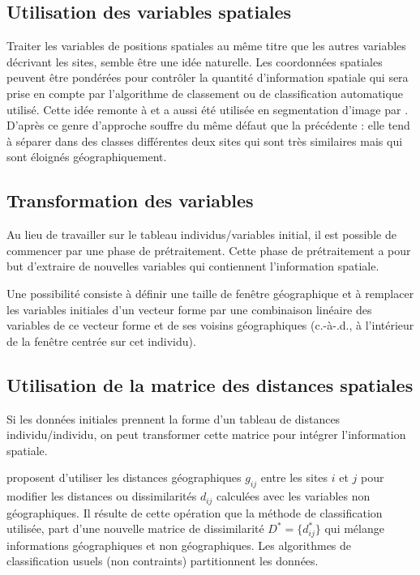 \subsection{Utilisation des variables spatiales}
Traiter les variables de positions spatiales au m\^eme titre que les 
autres variables d\'ecrivant les sites, semble \^etre une
id\'ee naturelle. Les coordonn\'ees
spatiales peuvent \^etre pond\'er\'ees pour contr\^oler
la quantit\'e d'information spatiale qui sera prise en compte par l'algorithme
de classement ou de classification automatique utilis\'e. Cette id\'ee remonte
\`a  et a aussi \'et\'e utilis\'ee en segmentation
d'image par . D'apr\`es  ce genre 
d'approche souffre du m\^eme d\'efaut que la pr\'ec\'edente : elle tend
\`a s\'eparer dans des classes diff\'erentes deux sites qui sont
tr\`es similaires mais qui sont \'eloign\'es g\'eographiquement.  



\subsection{Transformation des variables}

Au lieu de travailler sur le tableau individus/variables initial, il est
possible de commencer par une phase de pr\'etraitement. Cette phase de
pr\'etraitement a pour but d'extraire de nouvelles variables qui 
contiennent l'information spatiale.
\begin{ex}
Une possibilit\'e consiste \`a d\'efinir une taille de fen\^etre g\'eographique
et \`a remplacer les variables initiales d'un vecteur forme par une combinaison lin\'eaire
des variables de ce vecteur forme et de ses voisins g\'eographiques 
(c.-\`a-.d., \`a l'int\'erieur de la fen\^etre centr\'ee sur cet individu).
\end{ex}


\subsection{Utilisation de la matrice des distances spatiales}

Si les donn\'ees initiales prennent la forme d'un 
tableau de distances individu/individu, on peut 
transformer cette matrice pour int\'egrer l'information
spatiale.

 proposent d'utiliser les distances
g\'eographiques $g_{ij}$ entre les sites $i$ et $j$ pour modifier
les distances ou dissimilarit\'es $d_{ij}$ calcul\'ees avec
les variables non g\'eographiques. Il r\'esulte de cette
op\'eration que la m\'ethode de classification utilis\'ee,
part d'une nouvelle matrice de dissimilarit\'e $D^*=\{d^*_{ij}\}$
qui m\'elange informations g\'eographiques et non g\'eographiques.
Les algorithmes de classification usuels (non contraints) partitionnent
les donn\'ees. 

